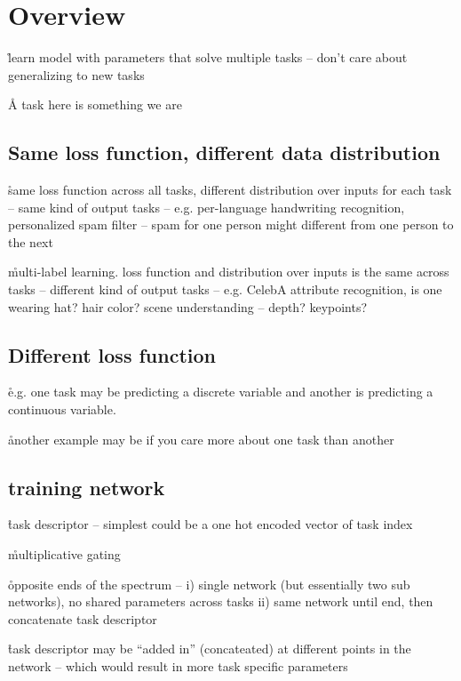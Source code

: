 \section{Overview}


\r{learn model with parameters that solve multiple tasks -- don't care about generalizing to new tasks}

\r{A task here is something we are }

\subsection{Same loss function, different data distribution}

\r{same loss function across all tasks, different distribution over inputs for each task -- same kind of output tasks -- e.g. per-language handwriting recognition, personalized spam filter -- spam for one person might different from one person to the next}

\r{multi-label learning. loss function and distribution over inputs is the same across tasks -- different kind of output tasks -- e.g. CelebA attribute recognition, is one wearing hat? hair color? scene understanding -- depth? keypoints?}

\subsection{Different loss function}

\r{e.g. one task may be predicting a discrete variable and another is predicting a continuous variable.}

\r{another example may be if you care more about one task than another}

\subsection{training network}

\r{task descriptor -- simplest could be a one hot encoded vector of task index}


\r{multiplicative gating}

\r{opposite ends of the spectrum -- i) single network (but essentially two sub networks), no shared parameters across tasks ii) same network until end, then concatenate task descriptor}


\r{task descriptor may be ``added in'' (concateated) at different points in the network -- which would result in more task specific parameters}


